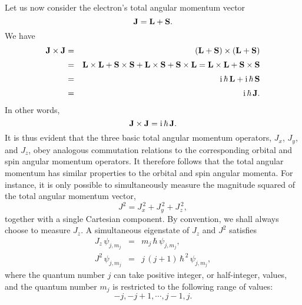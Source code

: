 Let us now consider the electron's total angular momentum vector
\begin{equation}
{\bf J} = {\bf L} + {\bf S}.
\end{equation}
We have
\begin{eqnarray}
{\bf J}\times{\bf J} &= &({\bf L}+{\bf S})\times({\bf L}+{\bf S})\nonumber\\[0.5ex]
&=& {\bf L}\times{\bf L} + {\bf S}\times{\bf S}+{\bf L}\times{\bf S}+{\bf S}\times{\bf L} ={\bf L}\times{\bf L} + {\bf S}\times{\bf S} \nonumber\\[0.5ex]
&=& {\rm i}\,\hbar\,{\bf L} + {\rm i}\,\hbar\,{\bf S}\nonumber\\[0.5ex]
&=& {\rm i}\,\hbar\,{\bf J}.
\end{eqnarray}
In other words,
\begin{equation}
{\bf J}\times{\bf J} = {\rm i}\,\hbar\,{\bf J}.
\end{equation}
It is thus evident that the three basic total angular momentum operators, $J_x$,
$J_y$, and $J_z$, obey  analogous commutation relations to the
corresponding orbital and spin angular momentum operators. It therefore follows
that the total angular momentum  has similar properties to the
orbital and spin angular momenta. For instance, it is
only possible to simultaneously measure the magnitude
squared of the total angular momentum vector,
\begin{equation}
J^2 =J_x^{\,2}+J_y^{\,2}+J_z^{\,2},
\end{equation}
together with a single Cartesian component. By convention, we shall
always choose to measure $J_z$. A simultaneous eigenstate
of $J_z$ and $J^2$ satisfies
\begin{eqnarray}
J_z\,\psi_{j,m_j}&=& m_j\,\hbar\,\psi_{j,m_j},\\[0.5ex]
J^2\,\psi_{j,m_j} &=& j\,(j+1)\,\hbar^{\,2}\,\psi_{j,m_j},
\end{eqnarray}
where the quantum number $j$ can take positive integer, or half-integer,
values, and the quantum number $m_j$ is restricted to the following
range of values:
\begin{equation}
-j, -j+1,\cdots, j-1, j.
\end{equation}

